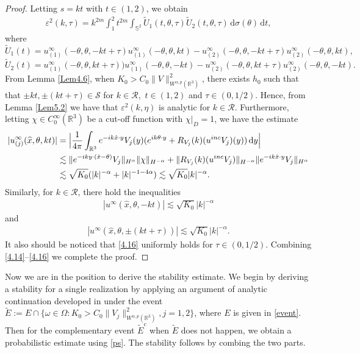 \documentclass[reqno, 12pt]{amsart}
\numberwithin{equation}{section}
\begin{document}
\begin{proof}
	Letting $s=kt$ with $t \in (1,2)$, we obtain\begin{align*}
		\varepsilon^2(k, \tau)  =k^{2m}\int_1^{2} t^{2m}\int_{\mathbb S^2}\widetilde U_1(t,\theta,\tau) \widetilde U_2(t,\theta,\tau)\,\mathrm{d}\sigma(\theta)\,\mathrm{d}t,
	\end{align*} where \[
	\widetilde U_1(t)=u_{(1)}^\infty(-\theta, \theta,-kt+\tau ) {u_{(1)}^\infty(-\theta,\theta,  kt)}-u_{(2)}^\infty(-\theta, \theta,-kt+\tau ) {u_{(2)}^\infty(-\theta,\theta,  kt)},
	\]\[\widetilde U_2(t)=u_{(1)}^\infty(-\theta, \theta,kt+\tau )) {u_{(1)}^\infty(-\theta,\theta,  -kt)}-u_{(2)}^\infty(-\theta, \theta,kt+\tau ) {u_{(2)}^\infty(-\theta,\theta,  -kt)}.\] From Lemma \ref{Lem4.6}, when $K_0>C_0\|V\|^2_{W^{\alpha,p}(\mathbb R^3)}$, there exists $h_0$ such that  that $ \pm kt,  \pm (kt+\tau) \in \mathscr{S}$ for $k \in \mathcal{R},$ $t \in (1,2)$ and $\tau \in (0,1/2)$. Hence, from Lemma \ref{Lem5.2} we have that $\varepsilon^2(k,\eta)$ is analytic for $k \in \mathcal R.$ Furthermore, letting $\chi \in C_0^\infty(\mathbb{R}^3)$ be a cut-off function with $\chi|_{D}=1$, 
	we have the estimate\begin{align}
		|u_{(j)}^\infty(\widehat x,\theta,kt)| &= \Big| \frac{1}{4\pi} \int_{\mathbb{R}^3}e^{-ik\hat{x}\cdot y} V_j(y)(e^{ik\theta \cdot y}+R_{V_j}(k)(u^{inc}V_j)(y))\,\mathrm{d}y \Big| \notag\\ &\lesssim \|e^{-iky\cdot (\hat x-\theta)} V_j\|_{H^{\alpha}}\|\chi\|_{H^{-\alpha}}+\|R_{V_j}(k)(u^{inc}V_j)\|_{H^{-\alpha}}\|e^{-ik\hat{x}\cdot y} V_j\|_{H^{\alpha}} \notag\\ & \lesssim \sqrt{K_0}(|k|^{-\alpha}+|k|^{-1-4\alpha}) \lesssim \sqrt{K_0}|k|^{-\alpha}. \label{4.14}\end{align}  
	Similarly, for $k \in \mathcal{R}$, there hold the inequalities \begin{align}\label{4.15}
		|u^\infty(\hat{x},\theta,-kt)| \lesssim  \sqrt{K_0}|k|^{-\alpha}
	\end{align} and \begin{align}\label{4.16}
		|u^\infty(\hat{x},\theta,\pm (kt+\tau))| \lesssim \sqrt{K_0}|k|^{-\alpha}.
	\end{align} It also should be noticed that \eqref{4.16} uniformly holds for $\tau \in (0,1/2)$. Combining \eqref{4.14}--\eqref{4.16} we complete the proof. 
\end{proof} 


Now we are in the position to derive the stability estimate.
We begin by deriving a stability for a single realization by
applying an argument of analytic continuation
developed in \cite{ZZ} under the event $\widetilde E:= E \cap \{\omega \in \Omega:K_0>C_0\|V_j\|^2_{W^{\alpha,p}(\mathbb R^3)} ,j=1,2\}$, where $E$ is given in \eqref{event}. Then for the complementary event $\widetilde E^c$ when $\widetilde E$ does not happen, we obtain a probabilistic estimate using \eqref{ps}. The stability follows by combing the two parts.
\end{document}
